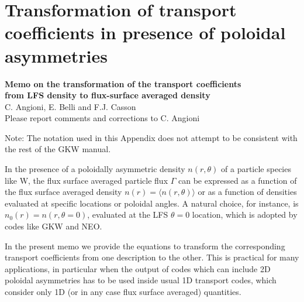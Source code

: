 \chapter{Transformation of transport coefficients in presence of poloidal asymmetries}

%
\newcommand{\Gfs}{\Gamma}
\newcommand{\exparg}{\exp\left\{-\frac{Ze\Phi(r,\theta)}{T(r)} +\frac{m \Omega^2(r)}{2T(r)} \left(R(r,\theta)^2 - R_0(r)^2\right)\right\}}
\newcommand{\nparder}{\frac{\partial n(r,\theta)} {\partial r}}
\newcommand{\Pparder}{\frac{\partial \Phi(r,\theta)} {\partial r}}
\newcommand{\noder}{\frac{d n_0(r)} {d r}}
\newcommand{\nder}{\frac{d n(r)} {d r}}
\newcommand{\Tlnder}{\frac{1}{T(r)} \frac{d T(r)} {d r}}
\newcommand{\Rsqdiff}{\left(R(r,\theta)^2 - R_0(r)^2\right)}
\newcommand{\dnoovdnoder}{n_0(r) \frac{dr}{d n_0(r)} }
\newcommand{\Ecf} E
\newcommand{\expargs}{\exp\left\{-{\Ecf}(r,\theta)\right\}}
\newcommand{\calGr}{{\cal G}_r}
%

\begin{center} 
{\bf Memo on the transformation of the transport
coefficients\\ 
from LFS density to flux-surface averaged density}\\[0.3cm]
C. Angioni, E. Belli and F.J. Casson\\[0.2cm]
Please report comments and corrections to C. Angioni
\end{center}

Note: The notation used in this Appendix does not attempt to be consistent with the rest of the GKW manual.

In the presence of a poloidally asymmetric density $n(r,\theta)$
of a particle species like W, 
the flux surface averaged particle flux $\Gfs$
can be expressed as a function of the flux surface averaged density
$n(r) = \langle n(r,\theta) \rangle$
or as a function of densities evaluated at specific locations
or poloidal angles. A natural choice, for instance,
is $n_0(r) = n(r,\theta = 0)$, evaluated at the LFS $\theta = 0$ location,
which is adopted by codes like GKW and NEO.

In the present memo we provide the equations to transform 
the corresponding transport coefficients from one description to the other.
This is practical for many applications, in particular when the output
of codes which can include 2D poloidal asymmetries has to be
used inside usual 1D transport codes, which consider only 1D
(or in any case flux surface averaged) quantities.

